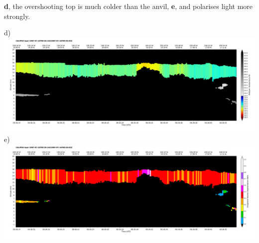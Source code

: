 \clearpage
\noindent\textbf{d}, the overshooting top is much colder than the anvil, \textbf{e}, and polarises light more strongly.
\vspace{3mm}

\noindent\textsf{\small d)}\\
\includegraphics[width=150mm,clip,trim=10mm 10mm 4mm 4mm]{images/overshooting-top/1calipso-temperature-layer.pdf}\\
\noindent\textsf{\small e)}\\
\includegraphics[width=150mm,clip,trim=10mm 10mm 4mm 4mm]{images/overshooting-top/1calipso-dratio-layer.pdf}\\

\normalsize\rmfamily
